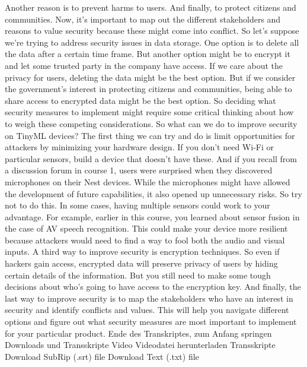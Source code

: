     Another reason is to prevent harms to users.
    And finally, to protect citizens and communities.
    Now, it's important to map out the different stakeholders and reasons
    to value security because these might come into conflict.
    So let's suppose we're trying to address security issues in data storage.
    One option is to delete all the data after a certain time frame.
    But another option might be to encrypt it and let some trusted
    party in the company have access.
    If we care about the privacy for users, deleting the data
    might be the best option.
    But if we consider the government's interest
    in protecting citizens and communities, being
    able to share access to encrypted data might be the best option.
    So deciding what security measures to implement
    might require some critical thinking about how to weigh these competing
    considerations.
    So what can we do to improve security on TinyML devices?
    The first thing we can try and do is limit opportunities for attackers
    by minimizing your hardware design.
    If you don't need Wi-Fi or particular sensors,
    build a device that doesn't have these.
    And if you recall from a discussion forum in course 1,
    users were surprised when they discovered microphones
    on their Nest devices.
    While the microphones might have allowed the development of future capabilities,
    it also opened up unnecessary risks.
    So try not to do this.
    In some cases, having multiple sensors could work to your advantage.
    For example, earlier in this course, you learned about sensor fusion
    in the case of AV speech recognition.
    This could make your device more resilient because attackers
    would need to find a way to fool both the audio and visual inputs.
    A third way to improve security is encryption techniques.
    So even if hackers gain access, encrypted data
    will preserve privacy of users by hiding certain details of the information.
    But you still need to make some tough decisions
    about who's going to have access to the encryption key.
    And finally, the last way to improve security
    is to map the stakeholders who have an interest in security
    and identify conflicts and values.
    This will help you navigate different options
    and figure out what security measures are most important to implement
    for your particular product.
    Ende des Transkriptes, zum Anfang springen
    Downloads und Transskripte
    Video
    Videodatei herunterladen
    Transskripte
    Download SubRip (.srt) file
    Download Text (.txt) file
    

